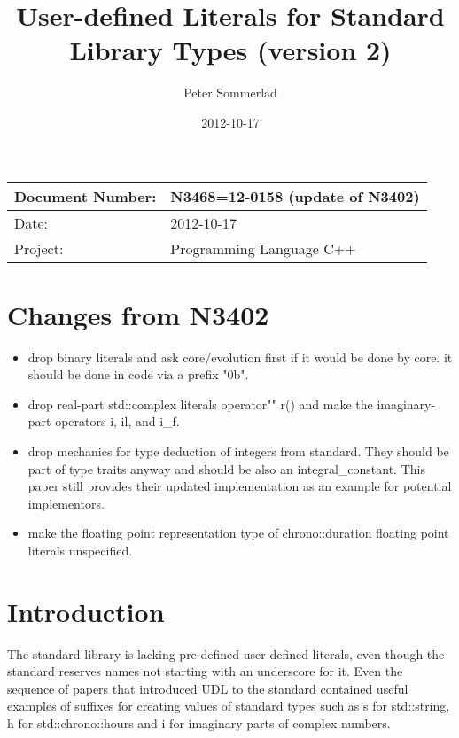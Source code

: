 \documentclass[ebook,11pt,article]{memoir}
\title{User-defined Literals for Standard Library Types (version 2)}
\author{Peter Sommerlad}
\date{2012-10-17}                                           %
\begin{document}
\maketitle
\begin{tabular}[t]{|l|l|}\hline 
Document Number: &  N3468=12-0158 (update of N3402)\\\hline
Date: & 2012-10-17 \\\hline
Project: & Programming Language C++\\\hline 
\end{tabular}

\chapter{Changes from N3402}
\begin{itemize}
\item drop binary literals and ask core/evolution first if it would be done by core. it should be done in code via a prefix "0b".
\item drop real-part std::complex literals operator"" r() and make the imaginary-part operators i, il, and i\_f.
\item drop mechanics for type deduction of integers from standard. They should be part of type traits anyway and should be also an integral\_constant. This paper still provides their updated implementation as an example for potential implementors.
\item make the floating point representation type of chrono::duration floating point literals unspecified.
\end{itemize}


\chapter{Introduction}
The standard library is lacking pre-defined user-defined literals, even though the standard reserves names not starting with an underscore for it. Even the sequence of papers that introduced UDL to the standard contained useful examples of suffixes for creating values of standard types such as s for std::string, h for std::chrono::hours and i for imaginary parts of complex numbers.
\end{document}
